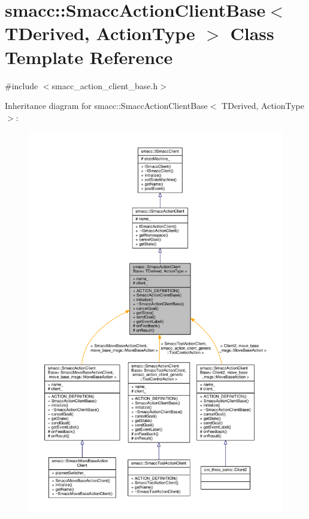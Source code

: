 \hypertarget{classsmacc_1_1SmaccActionClientBase}{}\section{smacc\+:\+:Smacc\+Action\+Client\+Base$<$ T\+Derived, Action\+Type $>$ Class Template Reference}
\label{classsmacc_1_1SmaccActionClientBase}


{\ttfamily \#include $<$smacc\+\_\+action\+\_\+client\+\_\+base.\+h$>$}



Inheritance diagram for smacc\+:\+:Smacc\+Action\+Client\+Base$<$ T\+Derived, Action\+Type $>$\+:
\nopagebreak
\begin{figure}[H]
\begin{center}
\leavevmode
\includegraphics[width=350pt]{classsmacc_1_1SmaccActionClientBase__inherit__graph}
\end{center}
\end{figure}


